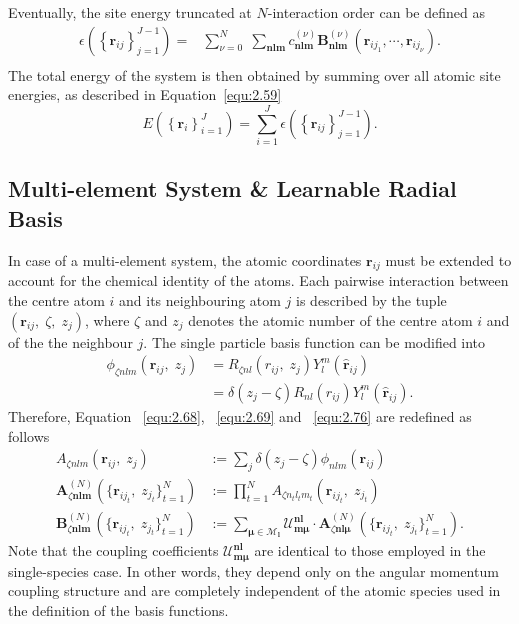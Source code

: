 Eventually, the site energy truncated at $N$-interaction order can be defined as
\begin{equation}
\label{equ:2.78}
\begin{split}
    \epsilon(\left\{\mathbf{r}_{ij}\right\}_{j=1}^{J-1}) =&\sum^{N}_{\nu=0}\;\sum_{\mathbf{nlm}}
c^{(\nu)}_{\mathbf{nlm}}\textbf{B}^{(\nu)}_{\mathbf{nlm}}(\mathbf{r}_{i{j}_{1}},\cdots,\mathbf{r}_{i{j}_{\nu}}). \\
\end{split}
\end{equation}
The total energy of the system is then obtained by summing over all atomic site energies, as described in Equation~\eqref{equ:2.59}
\[E(\left\{ \mathbf{r}_{i}\right\}_{i=1}^{J}) 
= \sum_{i=1}^{J} \epsilon(\left\{ \mathbf{r}_{ij}\right\}_{j=1}^{J-1}).\]

\subsection{Multi-element System \& Learnable Radial Basis} \label{sec:2.5.5}
In case of a multi-element system, the atomic coordinates $\mathbf{r}_{ij}$ must be extended to account for the chemical identity of the atoms.
Each pairwise interaction between the centre atom $i$ and its neighbouring atom $j$ is described by the tuple $(\mathbf{r}_{ij},\;\zeta,\;z_{j})$, where $\zeta$ and $z_{j}$ denotes the atomic number of the centre atom $i$ and of the the neighbour $j$.
The single particle basis function can be modified into 
\begin{equation} \label{equ:2.79}
\begin{split}
\phi_{\zeta nlm}(\textbf{r}_{ij},\;z_{j})
&= R_{\zeta nl}(r_{ij},\;z_{j})Y_{l}^{m}(\hat{\textbf{r}}_{ij}) \\
&= \delta(z_{j}-\zeta)R_{nl}(r_{ij})Y_{l}^{m}(\hat{\textbf{r}}_{ij}).
\end{split}
\end{equation}
Therefore, Equation ~\eqref{equ:2.68}, ~\eqref{equ:2.69} and ~\eqref{equ:2.76} are redefined as follows
\begin{equation} \label{equ:2.80}
\begin{split}
    A_{\zeta nlm}(\textbf{r}_{ij},\;z_{j}) 
    &:=\sum_{j}\delta(z_{j}-\zeta)\phi_{nlm}(\textbf{r}_{ij})
\\
    \textbf{A}^{(N)}_{\zeta\mathbf{nlm}}(\{\mathbf{r}_{ij_{t}},\;z_{j_{t}}\}^{N}_{t=1})
    &:=\prod_{t=1}^{N}A_{\zeta n_{t}l_{t}m_{t}}(\mathbf{r}_{ij_{t}},\;z_{j_{t}}) 
\\
    \textbf{B}^{(N)}_{\zeta\mathbf{nlm}}(\{\mathbf{r}_{ij_{t}},\;z_{j_{t}}\}^{N}_{t=1}) 
    &:=\sum_{\boldsymbol{\mu}\in\mathcal{M}_{\textbf{l}}}
    \mathcal{U}^{\textbf{nl}}_{\textbf{m}\boldsymbol{\mu}}\cdot
    \textbf{A}^{(N)}_{\zeta\mathbf{nl}\boldsymbol{\mu}}(\{\mathbf{r}_{ij_{t}},\;z_{j_{t}}\}^{N}_{t=1}).
\end{split}
\end{equation}
Note that the coupling coefficients $\mathcal{U}^{\textbf{nl}}_{\textbf{m}\boldsymbol{\mu}}$ are identical to those  employed in the single-species case.
In other words, they depend only on the angular momentum coupling structure and are completely independent of the atomic species used in the definition of the basis functions.

